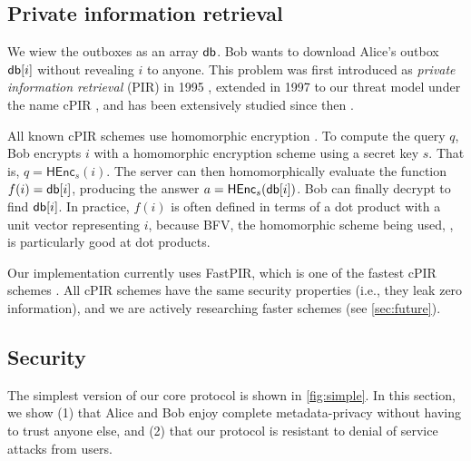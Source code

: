 \subsection{Private information retrieval}

We wiew the outboxes as an array $\mathsf{db}$. Bob wants to download Alice's outbox $\mathsf{db}[i]$ without revealing $i$ to anyone. This problem was first introduced as \textit{private information retrieval} (PIR) in 1995 \cite{chor1995private}, extended in 1997 to our threat model under the name cPIR \cite{kushilevitz1997replication}, and has been extensively studied since then \cite{melchor2016xpir,angel2018pir, ahmad2021addra}.

All known cPIR schemes use homomorphic encryption \cite{gentry2010computing}. To compute the query $q$, Bob encrypts $i$ with a homomorphic encryption scheme using a secret key $s$. That is, $q = \mathsf{HEnc}_s(i)$. The server can then homomorphically evaluate the function $f(i) = \mathsf{db}[i]$, producing the answer $a = \mathsf{HEnc}_s(\mathsf{db}[i])$. Bob can finally decrypt to find $\mathsf{db}[i]$. In practice, $f(i)$ is often defined in terms of a dot product with a unit vector representing $i$, because BFV, the homomorphic scheme being used, \cite{fan2012somewhat}, is particularly good at dot products.

Our implementation currently uses FastPIR, which is one of the fastest cPIR schemes \cite{ahmad2021addra}. All cPIR schemes have the same security properties (i.e., they leak zero information), and we are actively researching faster schemes (see \cref{sec:future}).

\subsection{Security}

The simplest version of our core protocol is shown in \cref{fig:simple}. In this section, we show (1) that Alice and Bob enjoy complete metadata-privacy without having to trust anyone else, and (2) that our protocol is resistant to denial of service attacks from users.




